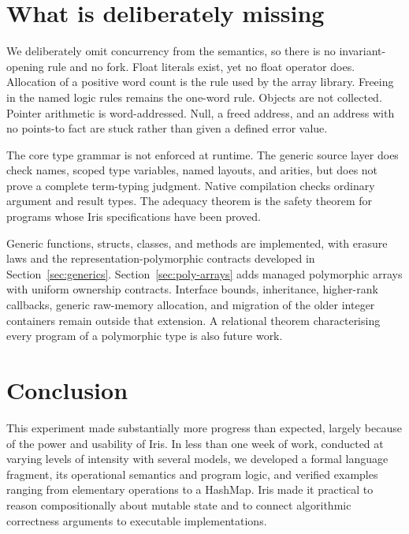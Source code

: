 \documentclass[11pt]{article}
\begin{document}




\section{What is deliberately missing}

We deliberately omit concurrency from the semantics, so there is no invariant-opening rule and no fork.
Float literals exist, yet no float operator does.
Allocation of a positive word count is the rule used by the array library.
Freeing in the named logic rules remains the one-word rule.
Objects are not collected.
Pointer arithmetic is word-addressed.
Null, a freed address, and an address with no points-to fact are stuck rather than given a defined error value.

The core type grammar is not enforced at runtime. The generic source layer
does check names, scoped type variables, named layouts, and arities, but
does not prove a complete term-typing judgment. Native compilation checks
ordinary argument and result types. The adequacy theorem is the safety
theorem for programs whose Iris specifications have been proved.

Generic functions, structs, classes, and methods are implemented, with
erasure laws and the representation-polymorphic contracts developed in
Section~\ref{sec:generics}. Section~\ref{sec:poly-arrays} adds managed
polymorphic arrays with uniform ownership contracts. Interface bounds, inheritance, higher-rank
callbacks, generic raw-memory allocation, and migration of the older
integer containers remain outside that extension. A relational theorem
characterising every program of a polymorphic type is also future work.

\section{Conclusion}
\label{sec:conclusion}

This experiment made substantially more progress than expected, largely because of the power and usability of Iris. In less than one week of work, conducted at varying levels of intensity with several models, we developed a formal language fragment, its operational semantics and program logic, and verified examples ranging from elementary operations to a HashMap. Iris made it practical to reason compositionally about mutable state and to connect algorithmic correctness arguments to executable implementations.
\end{document}
